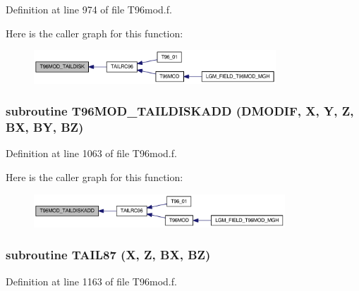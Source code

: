 Definition at line 974 of file T96mod.f.

Here is the caller graph for this function:\nopagebreak
\begin{figure}[H]
\begin{center}
\leavevmode
\includegraphics[width=257pt]{_t96mod_8f_b0a52ce0e8651f818014bb9cd0040927_icgraph}
\end{center}
\end{figure}
\hypertarget{_t96mod_8f_cbb331c88d418399755655497d909b64}{
\subsubsection[{T96MOD\_\-TAILDISKADD}]{\setlength{\rightskip}{0pt plus 5cm}subroutine T96MOD\_\-TAILDISKADD (DMODIF, \/  X, \/  Y, \/  Z, \/  BX, \/  BY, \/  BZ)}}
\label{_t96mod_8f_cbb331c88d418399755655497d909b64}




Definition at line 1063 of file T96mod.f.

Here is the caller graph for this function:\nopagebreak
\begin{figure}[H]
\begin{center}
\leavevmode
\includegraphics[width=267pt]{_t96mod_8f_cbb331c88d418399755655497d909b64_icgraph}
\end{center}
\end{figure}
\hypertarget{_t96mod_8f_f7a0147645dfe77e8197e10963ed3770}{
\subsubsection[{TAIL87}]{\setlength{\rightskip}{0pt plus 5cm}subroutine TAIL87 (X, \/  Z, \/  BX, \/  BZ)}}
\label{_t96mod_8f_f7a0147645dfe77e8197e10963ed3770}




Definition at line 1163 of file T96mod.f.

